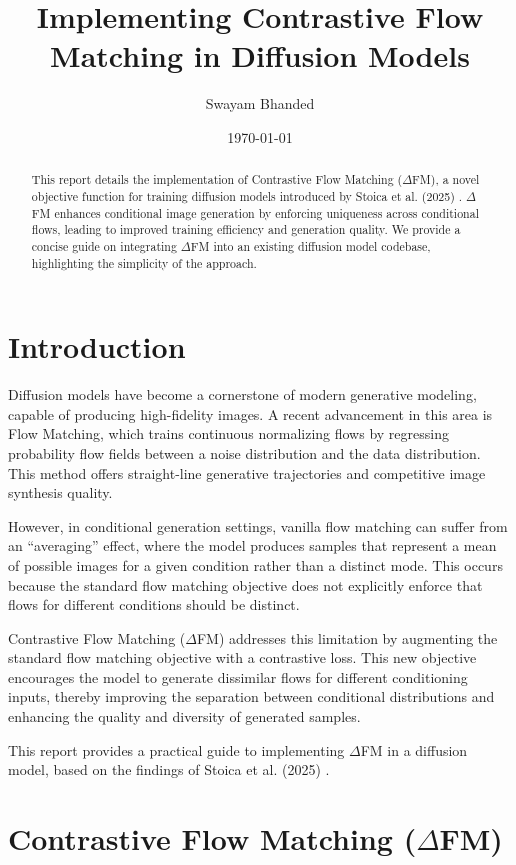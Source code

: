 \documentclass{article}
\title{Implementing Contrastive Flow Matching in Diffusion Models}
\author{Swayam Bhanded}
\date{\today}
\begin{document}
\maketitle

\begin{abstract}
This report details the implementation of Contrastive Flow Matching ($\Delta$FM), a novel objective function for training diffusion models introduced by Stoica et al. (2025) \cite{stoica2025}. $\Delta$FM enhances conditional image generation by enforcing uniqueness across conditional flows, leading to improved training efficiency and generation quality. We provide a concise guide on integrating $\Delta$FM into an existing diffusion model codebase, highlighting the simplicity of the approach.
\end{abstract}

\section{Introduction}

Diffusion models have become a cornerstone of modern generative modeling, capable of producing high-fidelity images. A recent advancement in this area is Flow Matching, which trains continuous normalizing flows by regressing probability flow fields between a noise distribution and the data distribution. This method offers straight-line generative trajectories and competitive image synthesis quality.

However, in conditional generation settings, vanilla flow matching can suffer from an ``averaging'' effect, where the model produces samples that represent a mean of possible images for a given condition rather than a distinct mode. This occurs because the standard flow matching objective does not explicitly enforce that flows for different conditions should be distinct.

Contrastive Flow Matching ($\Delta$FM) addresses this limitation by augmenting the standard flow matching objective with a contrastive loss. This new objective encourages the model to generate dissimilar flows for different conditioning inputs, thereby improving the separation between conditional distributions and enhancing the quality and diversity of generated samples.

This report provides a practical guide to implementing $\Delta$FM in a diffusion model, based on the findings of Stoica et al. (2025) \cite{stoica2025}.

\section{Contrastive Flow Matching ($\Delta$FM)}
\end{document}
